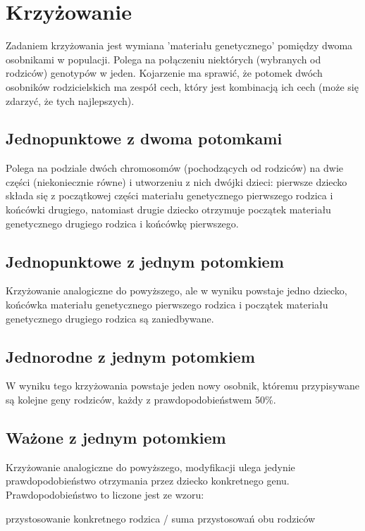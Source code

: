 \documentclass[11pt]{aghdpl}
\begin{document}
\chapter{Krzyżowanie}
\label{cha:crossing}
Zadaniem krzyżowania jest wymiana 'materiału genetycznego' pomiędzy dwoma osobnikami w populacji. Polega na połączeniu niektórych (wybranych od rodziców) genotypów w jeden. Kojarzenie ma sprawić, że potomek dwóch osobników rodzicielskich ma zespół cech, który jest kombinacją ich cech (może się zdarzyć, że tych najlepszych). 
 
\section{Jednopunktowe z dwoma potomkami}
\label{sec:jedenDwa}
Polega na podziale dwóch chromosomów (pochodzących od rodziców) na dwie części (niekoniecznie równe) i utworzeniu z nich dwójki dzieci: pierwsze dziecko składa się z początkowej części materiału genetycznego pierwszego rodzica i końcówki drugiego, natomiast drugie dziecko otrzymuje początek materiału genetycznego drugiego rodzica i końcówkę pierwszego.

\section{Jednopunktowe z jednym potomkiem}
\label{sec:jedenJeden}
Krzyżowanie analogiczne do powyższego, ale w wyniku powstaje jedno dziecko, końcówka materiału genetycznego pierwszego rodzica i początek materiału genetycznego drugiego rodzica są zaniedbywane.

\section{Jednorodne z jednym potomkiem}
\label{sec:uniform}
W wyniku tego krzyżowania powstaje jeden nowy osobnik, któremu przypisywane są kolejne geny rodziców, każdy z prawdopodobieństwem 50\%.

\section{Ważone z jednym potomkiem}
\label{sec:wazone}
Krzyżowanie analogiczne do powyższego, modyfikacji ulega jedynie prawdopodobieństwo otrzymania przez dziecko konkretnego genu. Prawdopodobieństwo to liczone jest ze wzoru:
\begin{center}
przystosowanie konkretnego rodzica / suma przystosowań obu rodziców
\end{center}
\end{document}
